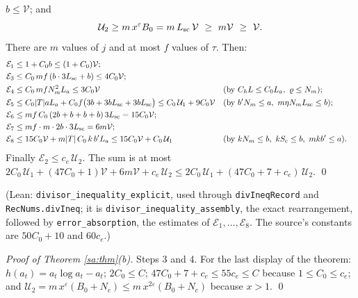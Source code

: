 \documentclass[11pt,letterpaper]{article}
\begin{document}
$b\le\mathcal V$; and
\begin{equation}\label{D:283}
 \mathcal U_2\ge m\,x^{\varepsilon}B_0=m\,L_{\rm sc}\,\mathcal V\ \ge\ m\mathcal V\ \ge\ \mathcal V .
\end{equation}
There are $m$ values of $j$ and at most $f$ values of $\tau$. Then:
\begin{align}\label{D:284}
 \mathcal E_1&\le1+C_0b\le(1+C_0)\mathcal V;\\
 \mathcal E_3&\le C_0\,mf\,(b\cdot3L_{\rm sc}+b)\le4C_0\mathcal V;\\
 \mathcal E_4&\le C_0\,mfN_m^2L_a\le3C_0\mathcal V&&(\text{by }C_hL\le C_0L_a,\ \varrho\le N_m);\\
 \mathcal E_5&\le C_0|T|aL_a+C_0f\big(3b+3bL_{\rm sc}+3bL_{\rm sc}\big)\le C_0\,\mathcal U_1+9C_0\mathcal V
   &&(\text{by }b'N_m\le a,\ m\eta N_mL_{\rm sc}\le b);\\
 \mathcal E_6&\le mf\,C_0\,(2b+b+b+b)\,3L_{\rm sc}=15C_0\mathcal V;\\
 \mathcal E_7&\le mf\cdot m\cdot2b\cdot3L_{\rm sc}=6m\mathcal V;\\
 \mathcal E_8&\le15C_0\mathcal V+m|T|\,C_0\,k\,b'L_a\le15C_0\mathcal V+C_0\,\mathcal U_1
   &&(\text{by }kN_m\le b,\ kS_{\rm c}\le b,\ mkb'\le a).
\end{align}
Finally $\mathcal E_2\le c_e\,\mathcal U_2$. The sum is at most
$2C_0\,\mathcal U_1+(47C_0+1)\mathcal V+6m\mathcal V+c_e\,\mathcal U_2
\le2C_0\,\mathcal U_1+(47C_0+7+c_e)\,\mathcal U_2$. \qed

\noindent(Lean: \texttt{divisor\_inequality\_explicit}, used through \texttt{divIneqRecord} and
\texttt{RecNums.divIneq}; it is \texttt{divisor\_inequality\_assembly}, the exact rearrangement, followed
by \texttt{error\_absorption}, the estimates of $\mathcal E_1,\dots,\mathcal E_8$. The source's constants
are $50C_0+10$ and $60c_e$.)

\emph{Proof of Theorem \ref{sa:thm}(b).} Steps 3 and 4. For the last display of the theorem:
$h(a_t)=a_t\log a_t-a_t$; $2C_0\le C$; $47C_0+7+c_e\le55c_e\le C$ because $1\le C_0\le c_e$; and
$\mathcal U_2=m\,x^{\varepsilon}(B_0+N_c)\le m\,x^{2\varepsilon}(B_0+N_c)$ because $x>1$. \qed
\end{document}
